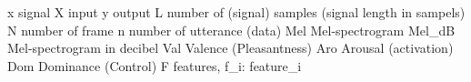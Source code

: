 


x           signal
X           input
y           output
L           number of (signal) samples (signal length in sampels)
N           number of frame
n           number of utterance (data)
Mel         Mel-spectrogram
Mel_{dB}    Mel-spectrogram in decibel
Val         Valence (Pleasantness)
Aro         Arousal (activation)
Dom         Dominance (Control)
F           features, f_i: feature_i
